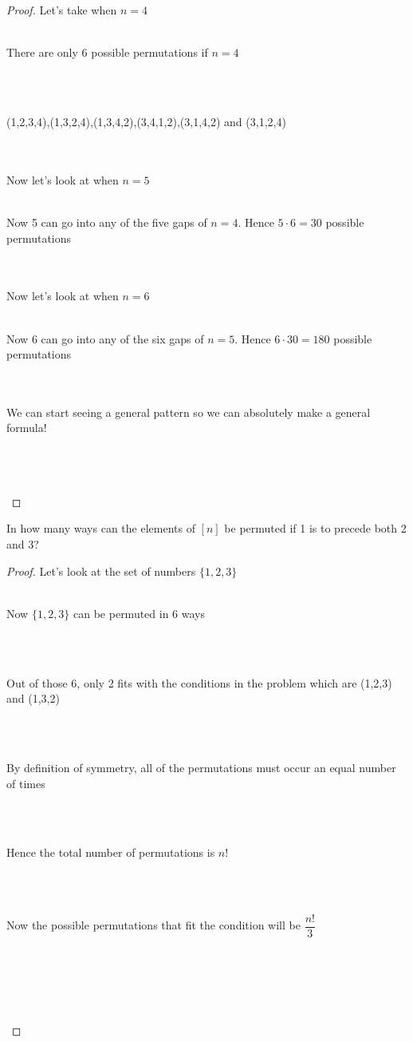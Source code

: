 \documentclass[12pt]{article}
\newenvironment{problem}[2][Problem]{\begin{trivlist}
\item[\hskip \labelsep {\bfseries #1}\hskip \labelsep {\bfseries #2.}]}{\end{trivlist}}
\begin{document}
\begin{proof}
Let's take when $n=4$ \\ \\
\centerline{There are only 6 possible permutations if $n=4$} \\ \\
\centerline{(1,2,3,4),(1,3,2,4),(1,3,4,2),(3,4,1,2),(3,1,4,2) and (3,1,2,4)} \\ \\
Now let's look at when $n=5$ \\ \\
\centerline{Now 5 can go into any of the five gaps of $n=4$. Hence $5 \cdot 6 = 30$ possible permutations} \\ \\
Now let's look at when $n=6$ \\ \\
\centerline{Now 6 can go into any of the six gaps of $n=5$. Hence $6 \cdot 30 = 180$ possible permutations} \\ \\
We can start seeing a general pattern so we can absolutely make a general formula! \\ \\
\centerline{} \\ \\


\end{proof}

\begin{problem}{3}
In how many ways can the elements of $[n]$ be permuted if 1 is to precede both 2 and 3?
\end{problem}

\begin{proof}
Let's look at the set of numbers $\{1,2,3\}$ \\ \\
\centerline{Now $\{1,2,3\}$ can be permuted in 6 ways} \\ \\
\centerline{Out of those 6, only 2 fits with the conditions in the problem which are (1,2,3) and (1,3,2)} \\ \\
\centerline{By definition of symmetry, all of the permutations must occur an equal number of times} \\ \\
\centerline{Hence the total number of permutations is $n!$} \\ \\
\centerline{Now the possible permutations that fit the condition will be $\dfrac{n!}{3}$} \\ \\ 
\centerline{
} \\ \\
\end{proof}
\end{document}
